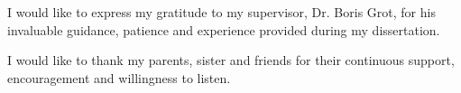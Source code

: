 I would like to express my gratitude to my supervisor, Dr. Boris Grot, for his invaluable guidance, patience and experience provided during my dissertation.

I would like to thank my parents, sister and friends for their continuous support, encouragement and willingness to listen.